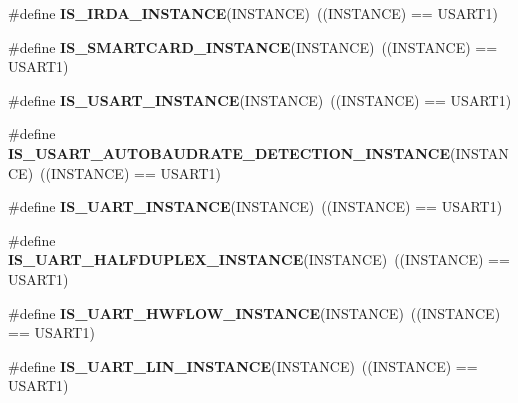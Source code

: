 \begin{DoxyCompactItemize}
\#define {\bfseries I\+S\+\_\+\+I\+R\+D\+A\+\_\+\+I\+N\+S\+T\+A\+N\+CE}(I\+N\+S\+T\+A\+N\+CE)~((I\+N\+S\+T\+A\+N\+CE) == U\+S\+A\+R\+T1)
\item 
\mbox{\label{group___exported__macro_gab2734c105403831749ccb34eeb058988}} 
\#define {\bfseries I\+S\+\_\+\+S\+M\+A\+R\+T\+C\+A\+R\+D\+\_\+\+I\+N\+S\+T\+A\+N\+CE}(I\+N\+S\+T\+A\+N\+CE)~((I\+N\+S\+T\+A\+N\+CE) == U\+S\+A\+R\+T1)
\item 
\mbox{\label{group___exported__macro_gafbce654f84a7c994817453695ac91cbe}} 
\#define {\bfseries I\+S\+\_\+\+U\+S\+A\+R\+T\+\_\+\+I\+N\+S\+T\+A\+N\+CE}(I\+N\+S\+T\+A\+N\+CE)~((I\+N\+S\+T\+A\+N\+CE) == U\+S\+A\+R\+T1)
\item 
\mbox{\label{group___exported__macro_ga4130cef42f8cada5a91c38b85f76939e}} 
\#define {\bfseries I\+S\+\_\+\+U\+S\+A\+R\+T\+\_\+\+A\+U\+T\+O\+B\+A\+U\+D\+R\+A\+T\+E\+\_\+\+D\+E\+T\+E\+C\+T\+I\+O\+N\+\_\+\+I\+N\+S\+T\+A\+N\+CE}(I\+N\+S\+T\+A\+N\+CE)~((I\+N\+S\+T\+A\+N\+CE) == U\+S\+A\+R\+T1)
\item 
\mbox{\label{group___exported__macro_gacbd2efab4cd39d4867c4dbeacb87e84b}} 
\#define {\bfseries I\+S\+\_\+\+U\+A\+R\+T\+\_\+\+I\+N\+S\+T\+A\+N\+CE}(I\+N\+S\+T\+A\+N\+CE)~((I\+N\+S\+T\+A\+N\+CE) == U\+S\+A\+R\+T1)
\item 
\mbox{\label{group___exported__macro_ga69c4aa0c561c4c39c621710fbbb0cb7b}} 
\#define {\bfseries I\+S\+\_\+\+U\+A\+R\+T\+\_\+\+H\+A\+L\+F\+D\+U\+P\+L\+E\+X\+\_\+\+I\+N\+S\+T\+A\+N\+CE}(I\+N\+S\+T\+A\+N\+CE)~((I\+N\+S\+T\+A\+N\+CE) == U\+S\+A\+R\+T1)
\item 
\mbox{\label{group___exported__macro_gaf9a11d0720f3efa780126414a4ac50ad}} 
\#define {\bfseries I\+S\+\_\+\+U\+A\+R\+T\+\_\+\+H\+W\+F\+L\+O\+W\+\_\+\+I\+N\+S\+T\+A\+N\+CE}(I\+N\+S\+T\+A\+N\+CE)~((I\+N\+S\+T\+A\+N\+CE) == U\+S\+A\+R\+T1)
\item 
\mbox{\label{group___exported__macro_ga7d2763df993c77cfa6e249ec7bc80482}} 
\#define {\bfseries I\+S\+\_\+\+U\+A\+R\+T\+\_\+\+L\+I\+N\+\_\+\+I\+N\+S\+T\+A\+N\+CE}(I\+N\+S\+T\+A\+N\+CE)~((I\+N\+S\+T\+A\+N\+CE) == U\+S\+A\+R\+T1)

\end{DoxyCompactItemize}
